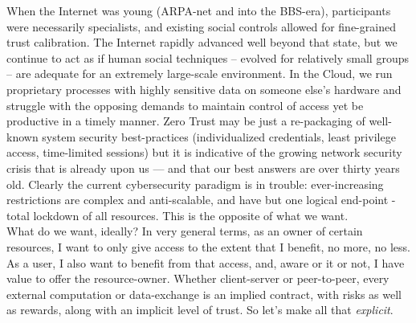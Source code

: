 %
%
%

When the Internet was young (ARPA-net and into the BBS-era), participants were necessarily specialists, and existing social controls allowed for fine-grained trust calibration.
The Internet rapidly advanced well beyond that state, but we continue to act as if human social techniques -- evolved for relatively small groups -- are adequate for an extremely large-scale environment.
In the Cloud, we run proprietary processes with highly sensitive data on someone else's hardware and struggle with the opposing demands to maintain control of access yet be productive in a timely manner.
Zero Trust may be just a re-packaging of well-known system security best-practices (individualized credentials, least privilege access, time-limited sessions) but it is indicative of the growing network security crisis that is already upon us --- and that our best answers are over thirty years old.
Clearly the current cybersecurity paradigm is in trouble: ever-increasing restrictions are complex and anti-scalable, and have but one logical end-point - total lockdown of all resources.
This is the opposite of what we want.
\\[10pt]
What do we want, ideally?
In very general terms, as an owner of certain resources, I want to only give access to the extent that I benefit, no more, no less.
As a user, I also want to benefit from that access, and, aware or it or not, I have value to offer the resource-owner.
Whether client-server or peer-to-peer, every external computation or data-exchange is an implied contract, with risks as well as rewards, along with an implicit level of trust.
So let's make all that \emph{explicit}.

